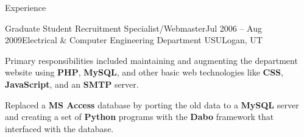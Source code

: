 \documentclass{resume} %
\begin{document}
\begin{rSection}{Experience}
\begin{rSubsection}{Graduate Student Recruitment Specialist/Webmaster}{Jul 2006 -- Aug 2009}{Electrical \& Computer Engineering Department USU}{Logan, UT}
	\item Primary responsibilities included maintaining and augmenting the department website using \textbf{PHP}, \textbf{MySQL}, and other basic web technologies like \textbf{CSS}, \textbf{JavaScript}, and an \textbf{SMTP} server.
	
	\item Replaced a \textbf{MS Access} database by porting the old data to a \textbf{MySQL} server and creating a set of \textbf{Python} programs with the \textbf{Dabo} framework that interfaced with the database.
	
	
	
	

\end{rSubsection}

\end{rSection}




\end{document}
